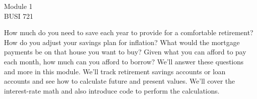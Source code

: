 \documentclass[english,12pt]{amsart}
\begin{document}
\begin{center}
    Module 1\\
    BUSI 721
\end{center}

\baselineskip

How much do you need to save each year to provide for a comfortable retirement?  How do you adjust your savings plan for inflation?  What would the mortgage payments be on that house you want to buy?  Given what you can afford to pay each month, how much can you afford to borrow?  We'll answer these questions and more in this module.  We'll track retirement savings accounts or loan accounts and see how to calculate future and present values.  We'll cover the interest-rate math and also introduce code to perform the calculations.
\end{document}
